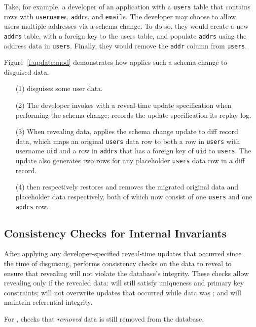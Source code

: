%
Take, for example, a developer of an application with a \texttt{users} table
that contains rows with \texttt{username}s, \texttt{addr}s, and \texttt{email}s.
The developer may choose to allow users multiple addresses via a schema
change. To do so, they would create a new \texttt{addrs} table, with a
foreign key to the users table, and populate \texttt{addrs} using the address
data in \texttt{users}.  Finally, they would remove the \texttt{addr} column
from \texttt{users}.
%

Figure~\ref{f:update:mod} demonstrates how \sys applies such a schema change 
to disguised data.  \begin{enumerate}[nosep]
    \item[(1)] \sys disguises some user data.
    \item[(2)] The developer invokes \sys with a reveal-time update
        specification when 
performing the schema change; \sys records the update specification its replay log.
    \item[(3)] When revealing data, \sys applies the schema change update
        to diff record data, which maps an original \texttt{users} data row to
        both
    a row in \texttt{users} with username \texttt{uid} and a row in
\texttt{addrs} that has a foreign key of \texttt{uid} to \texttt{users}.
%
The update also generates two rows for any placeholder \texttt{users}
data row in a diff record.
%
\item[(4)] \sys then respectively restores and removes the migrated original data and placeholder
        data respectively, both of which now consist of one \texttt{users} and
        one \texttt{addrs} row.
\end{enumerate}

\subsection{Consistency Checks for Internal Invariants} 
After applying any developer-specified reveal-time updates that occurred since
the time of disguising, \sys performs consistency checks on the data to reveal
to ensure that revealing will not violate the database's integrity.
%
These checks allow revealing only if the revealed data: \one{} will still
satisfy uniqueness and primary key constraints; \two{} will not overwrite
updates that occurred while data was \xxed; and \three{} will maintain
referential integrity.

For \one{}, \sys checks that \emph{removed} \xxed data is still removed from the
database.
%

